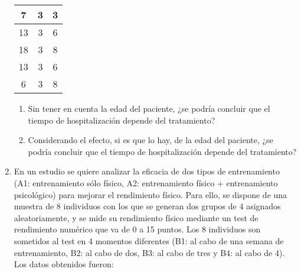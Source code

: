 \begin{enumerate}
\begin{center}
\begin{tabular}{|l|l|l|}
\hline
\multicolumn{1}{|c|}{7} & \multicolumn{1}{c|}{3} & \multicolumn{1}{c|}{3} \\
\hline
\multicolumn{1}{|c|}{13} & \multicolumn{1}{c|}{3} & \multicolumn{1}{c|}{6} \\
\hline
\multicolumn{1}{|c|}{18} & \multicolumn{1}{c|}{3} & \multicolumn{1}{c|}{8} \\
\hline
\multicolumn{1}{|c|}{13} & \multicolumn{1}{c|}{3} & \multicolumn{1}{c|}{6} \\
\hline
\multicolumn{1}{|c|}{6} & \multicolumn{1}{c|}{3} & \multicolumn{1}{c|}{8} \\
\hline
\end{tabular}

\end{center}

\begin{enumerate}

\item Sin tener en cuenta la edad del paciente, ¿se podría concluir que el tiempo de hospitalización depende del tratamiento?

\item Considerando el efecto, si es que lo hay, de la edad del paciente, ¿se podría concluir que el tiempo de hospitalización depende del tratamiento?

\end{enumerate}

\item En un estudio se quiere analizar la eficacia de dos tipos de entrenamiento (A1: entrenamiento sólo físico, A2: entrenamiento físico + entrenamiento psicológico) para mejorar el rendimiento físico. Para ello, se dispone de una muestra de 8 individuos con los que se generan dos grupos de 4 asignados aleatoriamente, y se mide su rendimiento físico mediante un test de rendimiento numérico que va de 0 a 15 puntos. Los 8 individuos son sometidos al test en 4 momentos diferentes (B1: al cabo de una semana de entrenamiento, B2: al cabo de dos, B3: al cabo de tres y B4: al cabo de 4). Los datos obtenidos fueron:


\end{enumerate}
